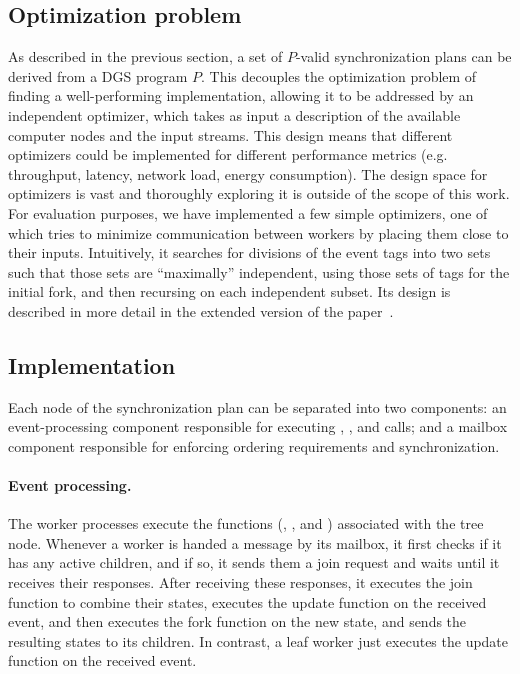 \subsection{Optimization problem}
\label{dgs:ssec:optimization-problem}

As described in the previous section, a set of $P$-valid synchronization
plans can be derived from a DGS program $P$. This decouples
the optimization problem of finding a well-performing implementation,
allowing it to be addressed by an independent optimizer,
which takes as input a
description of the available computer nodes and the input streams. This
design means that different optimizers could be implemented for
different performance metrics (e.g. throughput, latency, network load,
energy consumption).
The design space for optimizers is vast and thoroughly exploring it is outside of the scope of this work. For evaluation purposes, we have implemented a few simple optimizers, one of which tries to minimize communication between workers by placing them close to their inputs. Intuitively, it searches for divisions of the event tags into two sets such that those sets are ``maximally'' independent, using those sets of tags for the initial fork, and then recursing on each independent subset.
Its design is described in more detail in the extended version of the paper~\cite{flumina-arxiv}.

\subsection{Implementation}
\label{dgs:ssec:runtime}

Each node of the synchronization plan can be separated into two
components: an event-processing component
responsible for
executing ,
, and  calls; and a mailbox
component responsible for enforcing ordering requirements and
synchronization.

\paragraph{Event processing.}
The worker processes execute the functions (,
, and ) associated
with the tree node.  Whenever a worker is handed a message
by its mailbox, it first checks if it has any active children, and if
so, it sends them a join request and waits until it receives their
responses. After receiving these responses, it executes the join
function to combine their states, executes the update function on the
received event, and then executes the fork function on the new state,
and sends the resulting states to its children. In contrast, a leaf
worker just executes the update function on the received
event.

